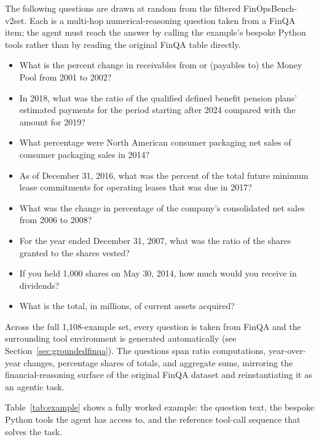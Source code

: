 \documentclass[11pt]{article}
\newcommand{\groundedfinqa}{FinOpsBench-v2}\xspace
\begin{document}
The following questions are drawn at random from the filtered \groundedfinqa set. Each is a multi-hop numerical-reasoning question taken from a FinQA item; the agent must reach the answer by calling the example's bespoke Python tools rather than by reading the original FinQA table directly.

\begin{itemize}
    \item What is the percent change in receivables from or (payables to) the Money Pool from 2001 to 2002?
    \item In 2018, what was the ratio of the qualified defined benefit pension plans' estimated payments for the period starting after 2024 compared with the amount for 2019?
    \item What percentage were North American consumer packaging net sales of consumer packaging sales in 2014?
    \item As of December 31, 2016, what was the percent of the total future minimum lease commitments for operating leases that was due in 2017?
    \item What was the change in percentage of the company's consolidated net sales from 2006 to 2008?
    \item For the year ended December 31, 2007, what was the ratio of the shares granted to the shares vested?
    \item If you held 1{,}000 shares on May 30, 2014, how much would you receive in dividends?
    \item What is the total, in millions, of current assets acquired?
\end{itemize}

Across the full 1{,}108-example set, every question is taken from FinQA and the surrounding tool environment is generated automatically (see Section~\ref{sec:groundedfinqa}). The questions span ratio computations, year-over-year changes, percentage shares of totals, and aggregate sums, mirroring the financial-reasoning surface of the original FinQA dataset and reinstantiating it as an agentic task.

Table~\ref{tab:example} shows a fully worked example: the question text, the bespoke Python tools the agent has access to, and the reference tool-call sequence that solves the task.
\end{document}

